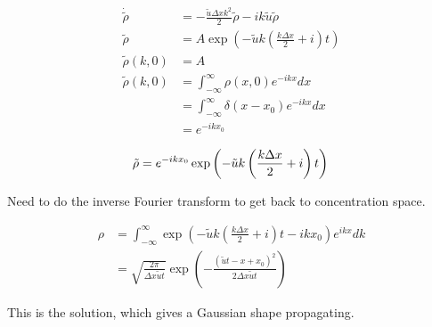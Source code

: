 \documentclass[a4paper]{article}
\begin{document}
\begin{align*}
\dot{\tilde{\rho}} & = - \frac{\tilde{u} \Delta x k^2}{2} \tilde{\rho} - ik \tilde{u} \tilde{\rho} \\
\tilde{\rho} & = A \exp \left( - \tilde{u} k \left( \frac{k \Delta x}{2} + i \right) t \right) \\
\tilde{\rho} (k, 0) & = A \\
\tilde{\rho} (k, 0) & = \int _{- \infty} ^{\infty} \rho (x, 0) e^{-ikx} dx \\
& = \int _{- \infty} ^{\infty} \delta (x - x_0)  e^{-ikx} dx \\
& = e^{-ik x_0} 
\end{align*}

\begin{equation}
\tilde{\rho}  = e^{-ik x_0} \exp \left( - \tilde{u} k \left( \frac{k \Delta x}{2} + i \right) t \right) \\
\end{equation}

Need to do the inverse Fourier transform to get back to concentration space. 

\begin{align*}
\rho & = \int _{- \infty } ^{\infty} \exp \left( - \tilde{u} k \left( \frac{k \Delta x}{2} + i \right) t -ikx_0 \right) e^{ikx} dk \\
& = \sqrt{\frac{2 \pi}{\Delta x \tilde{u} t}} \exp \left( - \frac{(\tilde{u} t - x + x_0 )^2}{2 \Delta x \tilde{u} t} \right)
\end{align*}

This is the solution, which gives a Gaussian shape propagating. 
\end{document}
